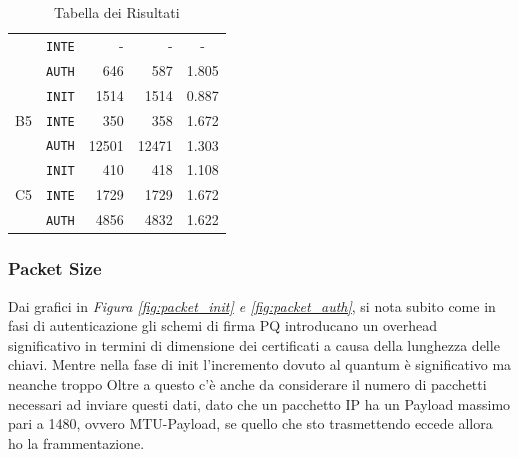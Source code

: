 \begin{table}[h!]
\begin{tabular}{clrrc}
                            & \texttt{INTE} & - & - & - \\
                            & \texttt{AUTH} & 646 & 587 & 1.805 \\ 
        \hline
        \multirow{3}{*}{B5} & \texttt{INIT} & 1514 & 1514 & 0.887 \\ 
                            & \texttt{INTE} & 350 & 358 & 1.672 \\
                            & \texttt{AUTH} & 12501 & 12471 & 1.303 \\ 
        \hline
        \multirow{3}{*}{C5} & \texttt{INIT} & 410 & 418 & 1.108 \\ 
                            & \texttt{INTE} & 1729 & 1729 & 1.672 \\
                            & \texttt{AUTH} & 4856 & 4832 & 1.622 \\ 
        \hline
    \end{tabular} 
    \caption{Tabella dei Risultati} 
    \label{tab:result}
        
\end{table}


\newpage 
\subsubsection*{Packet Size}
Dai grafici in \textit{Figura \ref{fig:packet_init} e \ref{fig:packet_auth}}, si nota subito come in fasi 
di autenticazione gli schemi di firma PQ introducano un overhead significativo in termini di dimensione dei certificati 
a causa della lunghezza delle chiavi. 
Mentre nella fase di init l'incremento dovuto al quantum è significativo ma neanche troppo
Oltre a questo c'è anche da considerare il numero di pacchetti necessari ad inviare questi dati, 
dato che un pacchetto IP ha un Payload massimo pari a 1480, ovvero MTU-Payload, se quello che sto 
trasmettendo eccede allora ho la frammentazione.



